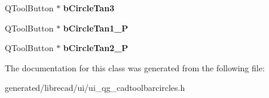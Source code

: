 \begin{DoxyCompactItemize}
\item 
\hypertarget{classUi__QG__CadToolBarCircles_a9c6e9a483b1562485479dabc69476c12}{Q\-Tool\-Button $\ast$ {\bfseries b\-Circle\-Tan3}}\label{classUi__QG__CadToolBarCircles_a9c6e9a483b1562485479dabc69476c12}

\item 
\hypertarget{classUi__QG__CadToolBarCircles_a767c44a7316465515d5ea2cc465d4da5}{Q\-Tool\-Button $\ast$ {\bfseries b\-Circle\-Tan1\-\_\-P}}\label{classUi__QG__CadToolBarCircles_a767c44a7316465515d5ea2cc465d4da5}

\item 
\hypertarget{classUi__QG__CadToolBarCircles_afa96d1b70deceb181ce2acb132ae05b6}{Q\-Tool\-Button $\ast$ {\bfseries b\-Circle\-Tan2\-\_\-P}}\label{classUi__QG__CadToolBarCircles_afa96d1b70deceb181ce2acb132ae05b6}

\end{DoxyCompactItemize}


The documentation for this class was generated from the following file\-:\begin{DoxyCompactItemize}
\item 
generated/librecad/ui/ui\-\_\-qg\-\_\-cadtoolbarcircles.\-h\end{DoxyCompactItemize}
